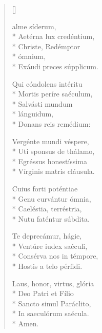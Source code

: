 \newHymn
{}

\pointtrans
\begin{multicols}{2}
\begin{verse}[\versewidth]

 alme síderum,\\*
Aetérna lux credéntium,        \\*      
Christe, Redémptor\\*
\qquad ómnium,       \\*    
Exáudi preces súpplicum. 

Qui cóndolens intéritu    \\*
Mortis períre saéculum,     \\*         
Salvásti mundum\\*
\qquad  lánguidum,    \\*       
Donans reis remédium:    

Vergénte mundi véspere,\\*              
Uti sponsus de thálamo,  \\*            
Egréssus honestíssima      \\*          
Vírginis matris cláusula.

Cuius forti poténtiae  \\*              
Genu curvántur ómnia,    \\*            
Caeléstia, terréstria,      \\*          
Nutu faténtur súbdita.   

Te deprecámur, hágie,\\*%
Ventúre iudex saéculi,         \\*      
Consérva nos in témpore,          \\*    
Hostis a telo pérfidi.   

Laus, honor, virtus, glória\\*
Deo Patri et Fílio\\*
Sancto simul Paráclito,\\*
In saeculórum saécula. \\*
\qquad Amen.


\end{verse}
\end{multicols}


